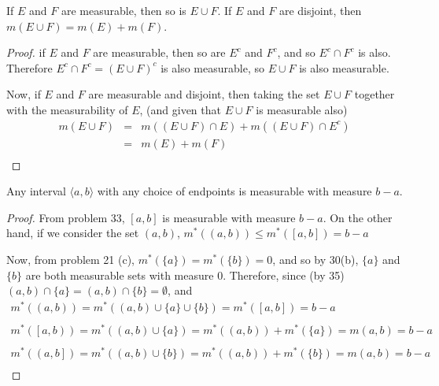 \begin{pblm}%
	If $E$ and $F$ are measurable, then so is $E \cup F$. If $E$ and $F$ are disjoint, 
	then $m(E \cup F) = m(E) + m(F)$. 
\begin{proof}
	if $E$ and $F$ are measurable, then so are $E^c$ and $F^c$, and so 
	$E^c \cap F^c$ is also. Therefore $E^c \cap F^c = (E \cup F)^c$ is also 
	measurable, so $E \cup F$ is also measurable. 

	Now, if $E$ and $F$ are measurable and disjoint, then taking the set $E \cup F$ 
	together with the measurability of $E$, (and given that $E \cup F$ is measurable also)
	\begin{equation*}
	\begin{array}{rcl}
		m(E \cup F) &=& m( (E \cup F) \cap E) + m( (E \cup F) \cap E^c)\\
			&=& m(E) + m(F)\\
	\end{array}
	\end{equation*}
\end{proof}
\end{pblm}

\begin{pblm}%
	Any interval $\langle a,b\rangle$ with any choice of endpoints is 
	measurable with measure $b-a$. 
\begin{proof}
	From problem 33, $[a, b]$ is measurable with measure $b - a$. 
	On the other hand, if we consider the set $(a, b)$, 
	$m^\ast((a, b)) \le m^\ast([a,b]) = b - a$

	Now, from problem 21 (c), $m^\ast(\{a\}) = m^\ast(\{b\}) = 0$, and so 
	by 30(b), $\{a\}$ and $\{b\}$ are both measurable sets with measure 
	$0$. Therefore, since (by 35) $(a, b) \cap \{a\} = (a, b) \cap \{b\} = \emptyset$, and 
	\begin{equation*}
	\begin{array}{c}
		m^\ast((a, b)) = m^\ast( (a, b) \cup \{a\} \cup \{b\}) = m^\ast([a, b]) = b - a\\
			\\
		m^\ast(\left[\right.a, b\left.\right)) = m^\ast((a, b) \cup \{a\}) = m^\ast((a, b)) + m^\ast(\{a\})= m(a, b) = b - a\\
		\\
		m^\ast(\left(\right.a, b\left.\right]) = m^\ast((a, b) \cup \{b\}) = m^\ast((a, b)) + m^\ast(\{b\})= m(a, b) = b - a\\
	\end{array}
	\end{equation*}
\end{proof}
\end{pblm}

